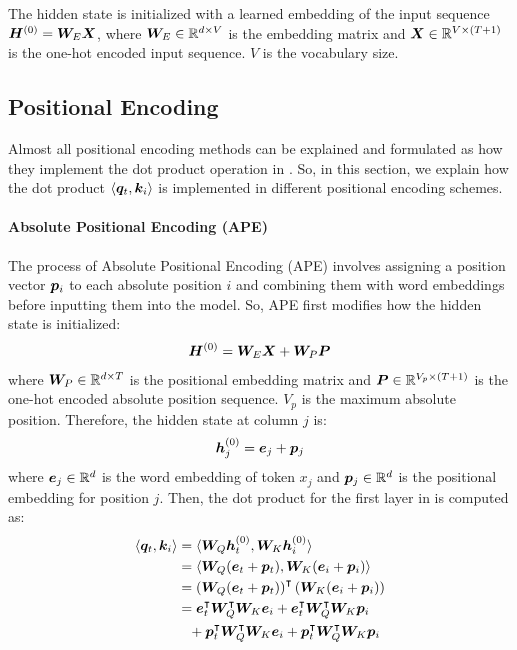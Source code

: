 \documentclass{article}
\begin{document}
The hidden state is initialized with a learned embedding of the input sequence ${\bm{H}}^{(0)} = {\bm{W}}_E {\bm{X}}$, where ${\bm{W}}_E \in \mathbb{R}^{d \times V}$ is the embedding matrix and ${\bm{X}} \in \mathbb{R}^{V \times (T+1)}$ is the one-hot encoded input sequence. $V$ is the vocabulary size.

\subsection{Positional Encoding}

Almost all positional encoding methods can be explained and formulated as how they implement the dot product operation in . So, in this section, we explain how the dot product $\langle {\bm{q}}_t, {\bm{k}}_i \rangle$ is implemented in different positional encoding schemes.




\paragraph{Absolute Positional Encoding (APE)}
The process of Absolute Positional Encoding (APE) involves assigning a position vector ${\bm{p}}_i$ to each absolute position $i$ and combining them with word embeddings before inputting them into the model. So, APE first modifies how the hidden state is initialized:
\begin{align}
  \label{eq:ape_init}
  {\bm{H}}^{(0)} = {\bm{W}}_E {\bm{X}} + {\bm{W}}_P {\bm{P}}
\end{align}
where ${\bm{W}}_P \in \mathbb{R}^{d \times T}$ is the positional embedding matrix and ${\bm{P}} \in \mathbb{R}^{V_p \times (T+1)}$ is the one-hot encoded absolute position sequence. $V_p$ is the maximum absolute position.
Therefore, the hidden state at column $j$ is:
\begin{align}
  \label{eq:ape_hidden_state}
  {\bm{h}}_j^{(0)} = {\bm{e}}_j + {\bm{p}}_j
\end{align}
where ${\bm{e}}_j \in \mathbb{R}^d$ is the word embedding of token $x_j$ and ${\bm{p}}_j \in \mathbb{R}^d$ is the positional embedding for position $j$.
Then, the dot product for the first layer in  is computed as:
\begin{align}
  \label{eq:ape_dot_product}
  \langle {\bm{q}}_t, {\bm{k}}_i \rangle & = \langle {\bm{W}}_Q {\bm{h}}_t^{(0)}, {\bm{W}}_K {\bm{h}}_i^{(0)} \rangle \nonumber                                                  \\
                               & = \langle {\bm{W}}_Q ({\bm{e}}_t + {\bm{p}}_t) , {\bm{W}}_K ({\bm{e}}_i + {\bm{p}}_i) \rangle \nonumber                                         \\
                               & = \left({\bm{W}}_Q ({\bm{e}}_t + {\bm{p}}_t)\right)^\intercal \left({\bm{W}}_K ({\bm{e}}_i + {\bm{p}}_i)\right) \nonumber                       \\
                               & = {\bm{e}}_t^\intercal {\bm{W}}_Q^\intercal {\bm{W}}_K {\bm{e}}_i + {\bm{e}}_t^\intercal {\bm{W}}_Q^\intercal {\bm{W}}_K {\bm{p}}_i \nonumber             \\
                               & \phantom{=} + {\bm{p}}_t^\intercal {\bm{W}}_Q^\intercal {\bm{W}}_K {\bm{e}}_i + {\bm{p}}_t^\intercal {\bm{W}}_Q^\intercal {\bm{W}}_K {\bm{p}}_i \nonumber \\
\end{align}
\end{document}
